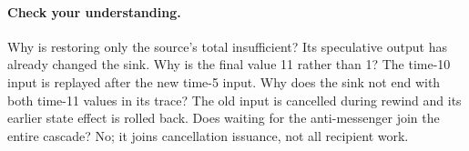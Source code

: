 \paragraph{Check your understanding.}
Why is restoring only the source's total insufficient? Its speculative
output has already changed the sink. Why is the final value 11 rather
than 1? The time-10 input is replayed after the new time-5 input.
Why does the sink not end with both time-11 values in its trace?
The old input is cancelled during rewind and its earlier state effect
is rolled back. Does waiting for the anti-messenger join the entire
cascade? No; it joins cancellation issuance, not all recipient work.
